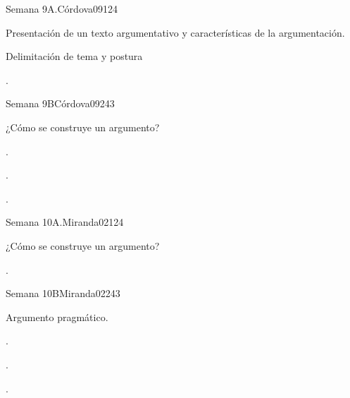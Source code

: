 \begin{syllabus}
\begin{unit}{Semana 9A.}{}{Córdova09}{12}{4}
   \begin{topics}
      \item Presentación de un texto argumentativo y características de la argumentación.
      \item Delimitación de tema y postura

   \end{topics}
   \begin{learningoutcomes}
      \item . 
   \end{learningoutcomes}
\end{unit}

\begin{unit}{Semana 9B}{}{Córdova09}{24}{3}
   \begin{topics}
      \item ¿Cómo se construye un argumento?
   \end{topics}

   \begin{learningoutcomes}
      \item . 
      \item .
      \item . 
      \end{learningoutcomes}
\end{unit}

\begin{unit}{Semana 10A.}{}{Miranda02}{12}{4}
   \begin{topics}
      \item ¿Cómo se construye un argumento?
   \end{topics}
   \begin{learningoutcomes}
      \item . 
   \end{learningoutcomes}
\end{unit}

\begin{unit}{Semana 10B}{}{Miranda02}{24}{3}
   \begin{topics}
      \item  Argumento pragmático.
   \end{topics}

   \begin{learningoutcomes}
      \item . 
      \item .
      \item . 
      \end{learningoutcomes}
\end{unit}


\end{syllabus}
